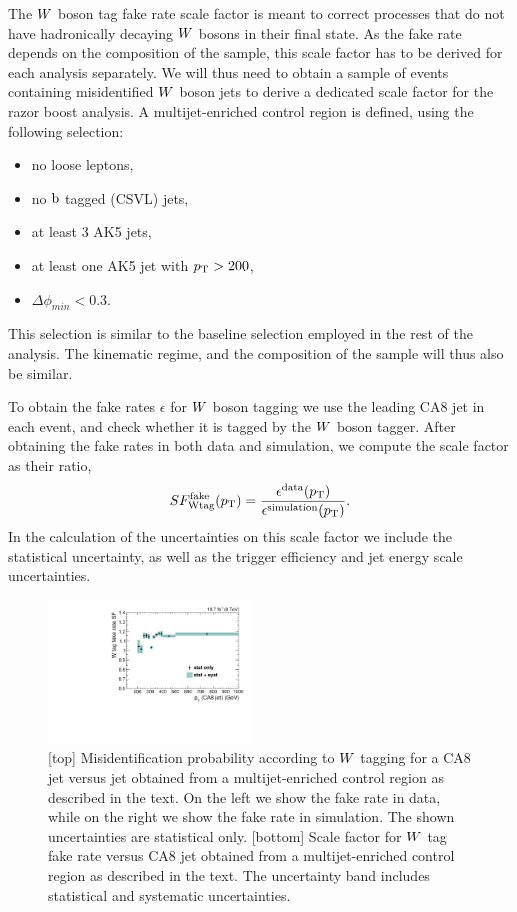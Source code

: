 The $W$ boson tag fake rate scale factor is meant to correct processes that do not have
hadronically decaying $W$ bosons in their final state. As the fake rate depends on the composition
of the sample, this scale factor has to be derived for each analysis separately. 
We will thus need to obtain a sample of events containing misidentified $W$ boson jets to derive a
dedicated scale factor for the razor boost analysis. A multijet-enriched control region is defined,
using the following selection:
\begin{itemize}
\item no loose leptons, 
\item no $\mathrm{b}$ tagged (CSVL) jets,
\item at least 3 AK5 jets,
\item at least one AK5 jet with $p_{\mathrm{T}}>200$\GeV,
\item $\Delta\phi_{min} < 0.3$.
\end{itemize}
This selection is similar to the baseline selection employed in the rest of the analysis. The
kinematic regime, and the composition of the sample will thus also be similar. 

To obtain the fake rates $\epsilon$ for $W$ boson tagging we use the leading CA8 jet in each
event, and check whether it is tagged by the $W$ boson tagger. After obtaining the
fake rates in both data and simulation, we compute the scale factor as their ratio,
\begin{equation}
SF_\textrm{Wtag}^\textrm{fake}(p_{\mathrm{T}}) =
\frac{\epsilon^{\textrm{data}}(p_{\mathrm{T}})}{\epsilon^{\textrm{simulation}}(p_{\mathrm{T}})}.
\end{equation} 
In the calculation of the uncertainties on this scale factor we include the statistical uncertainty,
as well as the trigger efficiency and jet energy scale uncertainties. 

\begin{figure}[htbp]
\centering

\includegraphics[width=0.48\textwidth]{figures/razor_wtag/SF_Wfake_Thesis}
\caption{[top] Misidentification probability according to $W$ tagging for a CA8 jet versus
jet \pt obtained from a multijet-enriched control region as described in the text. On the left
we show the fake rate in data, while on the right we show the fake rate in simulation. The shown
uncertainties are statistical only.
[bottom] Scale factor for $W$ tag fake rate versus CA8 jet \pt obtained from a
multijet-enriched control region as described in the text. The uncertainty band includes
statistical and systematic uncertainties.
\label{fig:boost_wfake}}
\end{figure}

